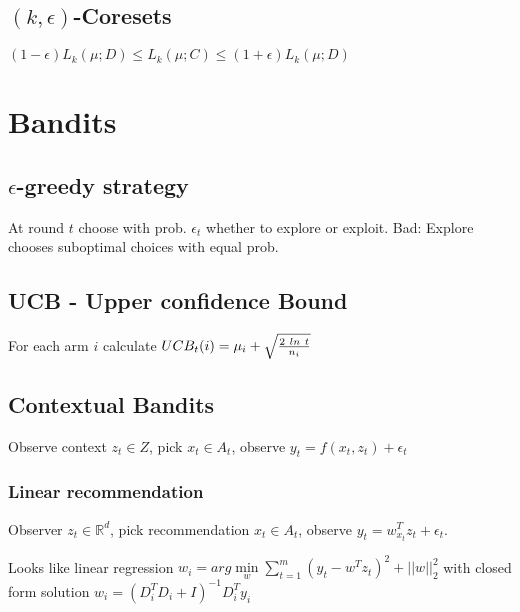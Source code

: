 \documentclass[a4paper,11pt,twocolumn]{article}
\begin{document}
\subsection{$(k,\epsilon)$-Coresets}

$(1-\epsilon)L_k(\mu;D) \leq 
L_k(\mu;C) \leq
(1+\epsilon)L_k(\mu;D)$

\section{Bandits}

\subsection{$\epsilon$-greedy strategy}
At round $t$ choose with prob. $\epsilon_t$ whether to explore or exploit. Bad: Explore chooses suboptimal choices with equal prob.

\subsection{UCB - Upper confidence Bound}
For each arm $i$ calculate $UCB_t(i) = 
\mu_i + 
\sqrt{{2~ln~t} \over n_i}$	

\subsection{Contextual Bandits}
Observe context $z_t \in Z$, pick $x_t \in A_t$, observe $y_t = f(x_t, z_t) + \epsilon_t$

\subsubsection{Linear recommendation}
Observer $z_t \in \mathbb{R}^d$, pick recommendation $x_t \in A_t$, observe $y_t = w_{x_t}^T z_t + \epsilon_t$.

Looks like linear regression 
$w_i = arg \min \limits_w \sum \limits_{t=1}^m (y_t - w^T z_t)^2 + ||w||_2^2$ 
with closed form solution $w_i = (D_i^T D_i + I)^{-1} D_i^T y_i$
\end{document}
